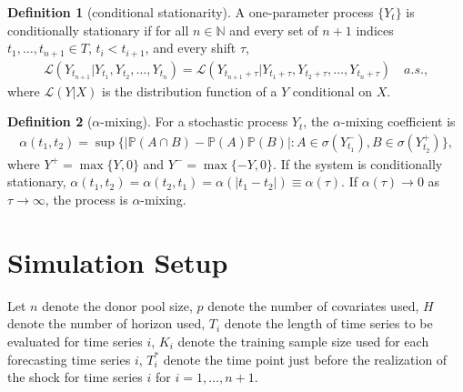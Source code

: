 \documentclass[12pt]{article}
\def\naturals{\mathbb{N}}
\def\mc#1{\mathcal{#1}} %
\def\mc#1{\mathcal{#1}}
\def\P{\mathbb{P}}
\theoremstyle{definition}
\theoremstyle{definition}
\newtheorem{definition}{Definition}
\begin{document}
\begin{definition}[conditional stationarity]
  A one-parameter process $\{Y_t\}$ is conditionally stationary if for all $n\in \naturals$ and every set of $n+1$ indices $t_1, \ldots, t_{n+1}\in T$, $t_i < t_{i+1}$, and every shift $\tau$,
  \begin{align*}
    \mc{L}(Y_{t_{n+1}}|Y_{t_1}, Y_{t_2}, \ldots, Y_{t_n})
    = \mc{L}(Y_{t_{n+1}+\tau}|Y_{t_1+\tau }, Y_{t_2+\tau }, \ldots, Y_{t_n+\tau })
    \quad a.s.,
  \end{align*}
  where $\mc{L}(Y|X)$ is the distribution function of a $Y$ conditional on $X$.
\end{definition}



\begin{definition}[$\alpha$-mixing]
  For a stochastic process $Y_t$, the $\alpha$-mixing coefficient is 
  \begin{align*}
    \alpha(t_1, t_2) = \sup \{
    |\P(A\cap B)-\P(A)\P(B)|\colon A\in \sigma(Y_{t_1}^{-}), B\in \sigma(Y_{t_2}^{+})\},
  \end{align*}
  where $Y^{+}=\max\{Y, 0\}$ and $Y^{-}=\max\{-Y, 0\}$. 
  If the system is conditionally stationary, $\alpha(t_1, t_2)=\alpha(t_2, t_1)=\alpha(|t_1-t_2|)\equiv \alpha(\tau)$. If $\alpha(\tau)\to 0$ as $\tau \to \infty$, the process is $\alpha$-mixing.
\end{definition}


\newpage

\section{Simulation Setup}

Let $n$ denote the donor pool size, $p$ denote the number of covariates used, $H$ denote the number of horizon used, $T_i$ denote the length of time series to be evaluated for time series $i$, $K_i$ denote the training sample size used for each  forecasting  time series $i$, $T_i^*$ denote the time point just before the realization of the shock for time series $i$ for $i = 1, \ldots, n+1$.
\end{document}

